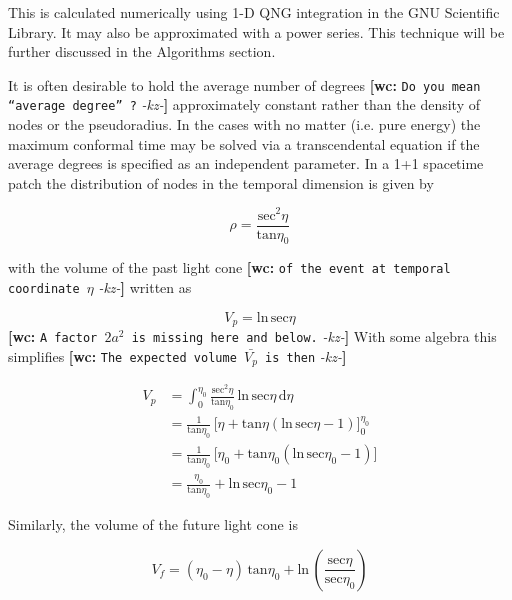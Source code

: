 \documentclass[preprint,notitlepage,amsmath,amssymb,floatfix]{revtex4-1}
\newcommand{\XXX}[3]{{\bf [#1: } {\tt #3} {\it -#2-}{\bf ]}}
\begin{document}
\noindent This is calculated numerically using 1-D QNG integration in the GNU Scientific Library.  It may also be approximated with a power series.  This technique will be further discussed in the Algorithms section. \par
It is often desirable to hold the average number of degrees \XXX{wc}{kz}{Do you mean ``average degree'' ?} approximately constant rather than the density of nodes or the pseudoradius.  
In the cases with no matter (i.e. pure energy) the maximum conformal time may be solved via a transcendental equation if the average degrees is specified as an independent parameter.
In a 1+1 spacetime patch the distribution of nodes in the temporal dimension is given by

\begin{equation}
\rho = \frac{\mathrm{sec}^2\eta}{\mathrm{tan}\eta_0}
\end{equation}

\noindent with the volume of the past light cone \XXX{wc}{kz}{of the event at temporal coordinate $\eta$} written as

\begin{equation}
V_p = \mathrm{ln} \, \mathrm{sec}\eta
\end{equation}
\XXX{wc}{kz}{A factor $2a^2$ is missing here and below.}
\noindent With some algebra this simplifies \XXX{wc}{kz}{The expected volume $\bar{V_p}$ is then}

\begin{equation}
\begin{split}
V_p &= \int_0^{\eta_0} \! \frac{\mathrm{sec}^2\eta}{\mathrm{tan}\eta_0} \, \mathrm{ln} \, \mathrm{sec}\eta \, \mathrm{d}\eta \\
  &= \frac{1}{\mathrm{tan}\eta_0} \, \lbrack \eta + \mathrm{tan}\eta (\mathrm{ln} \, \mathrm{sec}\eta - 1) \rbrack_0^{\eta_0} \\
  &= \frac{1}{\mathrm{tan}\eta_0} \, \lbrack \eta_0 + \mathrm{tan}\eta_0 (\mathrm{ln} \, \mathrm{sec}\eta_0 - 1) \rbrack \\
  &= \frac{\eta_0}{\mathrm{tan}\eta_0} + \mathrm{ln} \, \mathrm{sec}\eta_0 - 1
\end{split}
\end{equation}

\noindent Similarly, the volume of the future light cone is

\begin{equation}
V_f = (\eta_0 - \eta) \, \mathrm{tan}\eta_0 + \mathrm{ln} \, \left(\frac{\mathrm{sec}\eta}{\mathrm{sec}\eta_0}\right)
\end{equation}
\end{document}
